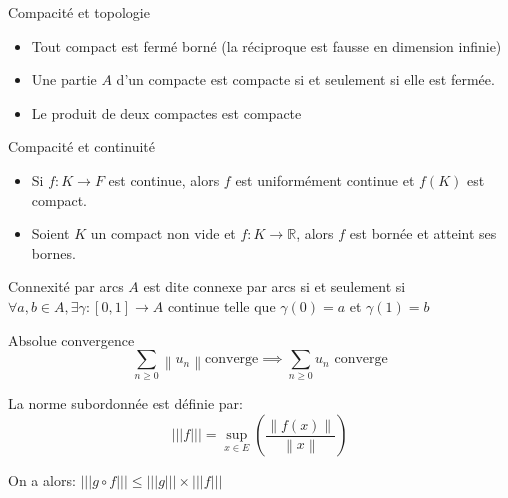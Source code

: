 \documentclass[french, a4paper, 11pt, twocolumn]{article}
\newcommand{\ssi}{si et seulement si\xspace}		%
\newcommand{\norme}[1]{\left\| #1\right\|}
\newcommand{\R}{\mathbb{R}}   %
\newcommand{\po}{\left(}         %
\newcommand{\pf}{\right)}        %
\newcommand{\pof}[1]{\po #1 \pf} %
\begin{document}
\begin{theoreme}{Compacité et topologie}
    \begin{itemize}[label=$\bullet$]
        \item Tout compact est fermé borné (la réciproque est fausse en dimension infinie)
        \item Une partie $A$ d'un compacte est compacte \ssi elle est fermée.
        \item Le produit de deux compactes est compacte
    \end{itemize}
\end{theoreme}

\begin{theoreme}{Compacité et continuité}
    \begin{itemize}[label=$\bullet$]
        \item Si $f : K \rightarrow F$ est continue, alors $f$ est uniformément continue et $f(K)$ est compact.
        \item Soient $K$ un compact non vide et $f : K \rightarrow \R$, alors $f$ est bornée et atteint ses bornes.
    \end{itemize}
    
\end{theoreme}

\begin{theoreme}{Connexité par arcs}
    $A$ est dite connexe par arcs \ssi $\forall a,b \in A, \exists \gamma : [0,1] \rightarrow A$ continue telle que $\gamma(0)=a$ et $\gamma(1)=b$
\end{theoreme}

\begin{theoreme}{Absolue convergence}
    \[\sum_{n \geq 0} \norme{u_n} \text{converge} \implies \sum_{n \geq 0} u_n \text{ converge}\]
\end{theoreme}

\begin{definition}
    La norme subordonnée est définie par:
    \[|||f|||=\underset{x \in E}{\sup}\pof{\dfrac{\norme{f(x)}}{\norme{x}}}\]

    On a alors: $|||g \circ f||| \leq |||g||| \times |||f|||$
\end{definition}
\end{document}
